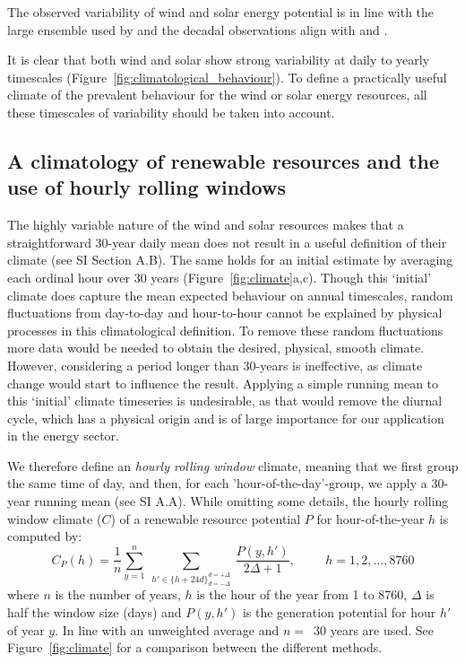 \documentclass[a4paper,11pt]{extarticle}
\begin{document}
The observed variability of wind and solar energy potential is in line with the large ensemble used by \textcite{vanderwiel2019extreme} and the decadal observations align with \textcite{Bett2013} and \textcite{wohland2019significant}.

It is clear that both wind and solar show strong variability at daily to yearly timescales (Figure~\ref{fig:climatological_behaviour}). 
To define a practically useful climate of the prevalent behaviour for the wind or solar energy resources, all these timescales of variability should be taken into account.








\subsection{A climatology of renewable resources and the use of hourly rolling windows}
The highly variable nature of the wind and solar resources makes that a straightforward 30-year daily mean does not result in a useful definition of their climate (see SI Section A.B). 
The same holds for an initial estimate by averaging each ordinal hour over 30 years (Figure~\ref{fig:climate}a,c). 
Though this `initial' climate does capture the mean expected behaviour on annual timescales, random fluctuations from day-to-day and hour-to-hour cannot be explained by physical processes in this climatological definition. 
To remove these random fluctuations more data would be needed to obtain the desired, physical, smooth climate. 
However, considering a period longer than 30-years is ineffective, as climate change would start to influence the result. 
Applying a simple running mean to this `initial' climate timeseries is undesirable, as that would remove the diurnal cycle, which has a physical origin and is of large importance for our application in the energy sector.

We therefore define an \emph{hourly rolling window} climate, meaning that we first group the same time of day, and then, for each 'hour-of-the-day'-group, we apply a 30-year running mean (see SI A.A). 
While omitting some details, the hourly rolling window climate ($C$) of a renewable resource potential $P$ for hour-of-the-year $h$ is computed by:
\begin{equation}
        C_P(h) = \frac{1}{n}\sum_{y=1}^n ~\sum_{h' \in \{h+24d\}_{d=-\Delta}^{d=+\Delta}} ~ \frac{P(y, h')}{2 \Delta +1} ,\hspace{1cm} h = 1,2,\ldots,8760 \label{eq:HRWclim}
\end{equation}
where $n$ is the number of years, $h$ is the hour of the year from 1 to 8760, $\Delta$ is half the window size (days) and $P(y,h')$ is the generation potential for hour $h'$ of year $y$. 
In line with \parencite{Arguez2011} an unweighted average and $n=$~30 years are used.
See Figure~\ref{fig:climate} for a comparison between the different methods.
\end{document}
